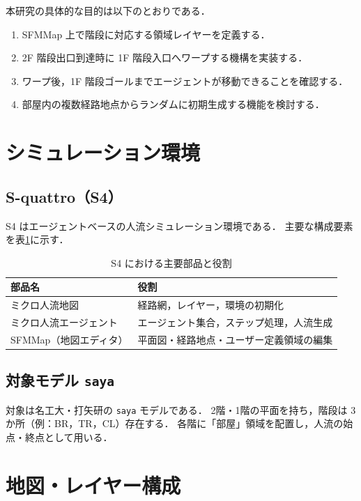 \documentclass[11pt,a4paper]{ltjsarticle}
\begin{document}
本研究の具体的な目的は以下のとおりである．
\begin{enumerate}[label=\arabic*.]
  \item SFMMap 上で階段に対応する領域レイヤーを定義する．
  \item 2F 階段出口到達時に 1F 階段入口へワープする機構を実装する．
  \item ワープ後，1F 階段ゴールまでエージェントが移動できることを確認する．
  \item 部屋内の複数経路地点からランダムに初期生成する機能を検討する．
\end{enumerate}

\section{シミュレーション環境}

\subsection{S-quattro（S4）}

S4 はエージェントベースの人流シミュレーション環境である．
主要な構成要素を表\ref{tab:components}に示す．

\begin{table}[H]
  \centering
  \caption{S4 における主要部品と役割}
  \label{tab:components}
  \begin{tabular}{ll}
    \toprule
    部品名 & 役割 \\
    \midrule
    ミクロ人流地図 & 経路網，レイヤー，環境の初期化 \\
    ミクロ人流エージェント & エージェント集合，ステップ処理，人流生成 \\
    SFMMap（地図エディタ） & 平面図・経路地点・ユーザー定義領域の編集 \\
    \bottomrule
  \end{tabular}
\end{table}

\subsection{対象モデル \texttt{saya}}

対象は名工大・打矢研の \texttt{saya} モデルである．
2階・1階の平面を持ち，階段は 3 か所（例：BR，TR，CL）存在する．
各階に「部屋」領域を配置し，人流の始点・終点として用いる．

\section{地図・レイヤー構成}
\end{document}
